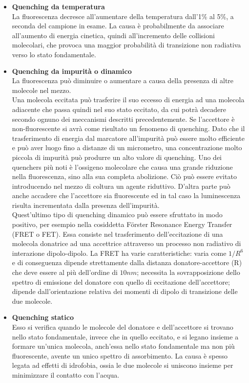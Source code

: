\begin{itemize}
\item \textbf{Quenching da temperatura}\\
La fluorescenza decresce all'aumentare della temperatura dall'1\% al 5\%, a seconda del campione in esame. 
La causa è probabilmente da associare all'aumento di energia cinetica, quindi all'incremento delle collisioni molecolari, che provoca una maggior probabilità di transizione non radiativa verso lo stato fondamentale.

\item \textbf{Quenching da impurità o dinamico} \\
La fluorescenza può diminuire o aumentare a causa della presenza di altre molecole nel mezzo.
\\Una molecola eccitata può trasferire il suo eccesso di energia ad una molecola adiacente che passa quindi nel suo stato eccitato, da cui potrà decadere
secondo ognuno dei meccanismi descritti precedentemente. 
Se l'accettore è non-fluorescente si avrà come risultato un fenomeno di quenching. 
Dato che il trasferimento di energia dal marcatore all'impurità può essere molto efficiente e può aver luogo fino a distanze di un micrometro, una concentrazione molto piccola di impurità può produrre un alto valore di quenching. 
Uno dei quenchers più noti è l'ossigeno molecolare che causa una grande riduzione nella fluorescenza, sino alla sua completa abolizione. 
Ciò può essere evitato introducendo nel mezzo di coltura un agente riduttivo.
D'altra parte può anche accadere che l'accettore sia fluorescente ed in tal caso la luminescenza risulta incrementata dalla presenza dell'impurità.
\\Quest'ultimo tipo di quenching dinamico può essere sfruttato in modo positivo, per esempio nella cosiddetta F\"{o}rster Resonance Energy Transfer (FRET o FET). 
Essa consiste nel trasferimento dell'eccitazione di una molecola donatrice ad una accettrice attraverso un processo non radiativo di interazione dipolo-dipolo.
La FRET ha varie caratteristiche: varia come $1/R^6$ e di conseguenza dipende strettamente dalla distanza donatore-accettore (R) che deve essere al più dell'ordine di $10 nm$; necessita la sovrapposizione dello spettro di emissione del donatore con quello di eccitazione dell'accettore; dipende dall'orientazione relativa dei momenti di dipolo di transizione delle due molecole.

\item \textbf{Quenching statico} \\
Esso si verifica quando le molecole del donatore e dell'accettore si trovano nello stato fondamentale, invece che in quello eccitato, e si legano insieme a formare un'unica molecola, anch'essa nello stato fondamentale ma non più fluorescente, avente un unico spettro di assorbimento. 
La causa è spesso legata ad effetti di idrofobia, ossia le due molecole si uniscono insieme per minimizzare il contatto con l'acqua.


\end{itemize}
